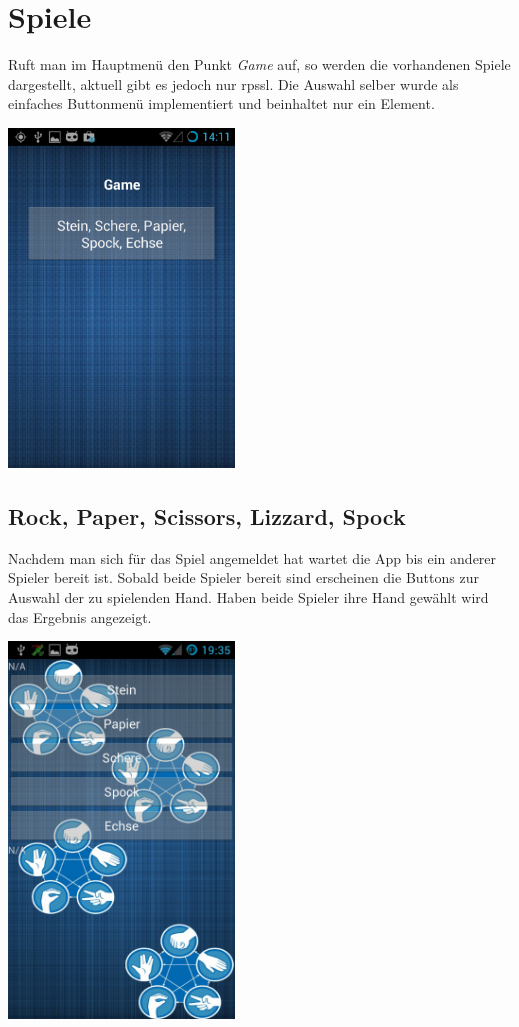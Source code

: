 \section{Spiele}
Ruft man im Hauptmenü den Punkt \textit{Game} auf, so werden die vorhandenen Spiele dargestellt, aktuell gibt es jedoch nur \gls{rpssl}. Die Auswahl selber wurde als einfaches Buttonmenü implementiert und beinhaltet nur ein Element.
\begin{capfigure}
	\includegraphics[width=6cm]{images/app/gamelist}
\end{capfigure}
\clearpage
\subsection{Rock, Paper, Scissors, Lizzard, Spock}
Nachdem man sich für das Spiel angemeldet hat wartet die App bis ein anderer Spieler bereit ist. Sobald beide Spieler bereit sind erscheinen die Buttons zur Auswahl der zu spielenden Hand. Haben beide Spieler ihre Hand gewählt wird das Ergebnis angezeigt.

\begin{capfigure}
	\includegraphics[width=6cm]{images/app/rpssl}
\end{capfigure}

